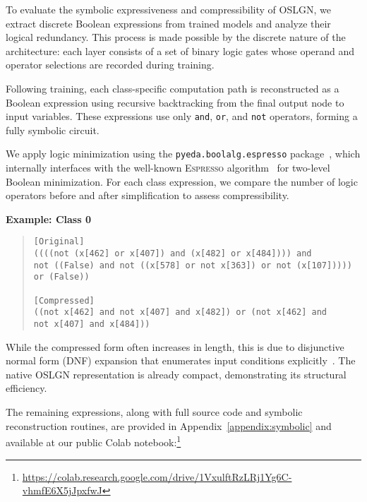 To evaluate the symbolic expressiveness and compressibility of OSLGN, we extract discrete Boolean expressions from trained models and analyze their logical redundancy. This process is made possible by the discrete nature of the architecture: each layer consists of a set of binary logic gates whose operand and operator selections are recorded during training.

Following training, each class-specific computation path is reconstructed as a Boolean expression using recursive backtracking from the final output node to input variables. These expressions use only \texttt{and}, \texttt{or}, and \texttt{not} operators, forming a fully symbolic circuit.

We apply logic minimization using the \texttt{pyeda.boolalg.espresso} package~\cite{piazza2014pyeda}, which internally interfaces with the well-known \textsc{Espresso} algorithm~\cite{brayton1984espresso} for two-level Boolean minimization. For each class expression, we compare the number of logic operators before and after simplification to assess compressibility.

\vspace{0.5em}
\noindent \textbf{Example: Class 0}

\begin{quote}
\begin{verbatim}
[Original]
((((not (x[462] or x[407]) and (x[482] or x[484]))) and 
not ((False) and not ((x[578] or not x[363]) or not (x[107])))) or (False))

[Compressed]
((not x[462] and not x[407] and x[482]) or (not x[462] and 
not x[407] and x[484]))
\end{verbatim}
\end{quote}

While the compressed form often increases in length, this is due to disjunctive normal form (DNF) expansion that enumerates input conditions explicitly~\cite{sipser2012introduction}. The native OSLGN representation is already compact, demonstrating its structural efficiency.

\vspace{0.5em}
The remaining expressions, along with full source code and symbolic reconstruction routines, are provided in Appendix~\ref{appendix:symbolic} and available at our public Colab notebook:\footnote{\url{https://colab.research.google.com/drive/1VxulftRzLRj1Yg6C-vhmfE6X5jJpxfwJ}}
